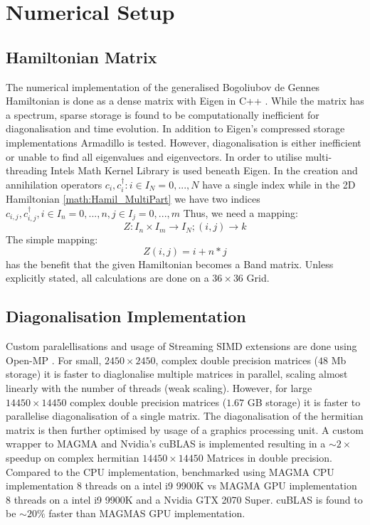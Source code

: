 \documentclass[Master]{subfiles}
\begin{document}
\section{Numerical Setup}
\subsection{Hamiltonian Matrix}
The numerical implementation of the generalised Bogoliubov de Gennes Hamiltonian  is done as a dense matrix with Eigen \cite{eigenweb} in C++ \cite{ISO:2017:IIIa}.
While the matrix has a spectrum, sparse storage is found to be computationally inefficient for diagonalisation and time evolution. In addition to Eigen's compressed storage implementations Armadillo \cite{sanderson2016armadillo}\cite{sanderson2018user} is tested. However, diagonalisation is either inefficient or unable to find all eigenvalues and eigenvectors. In order to utilise multi-threading Intels Math Kernel Library \cite{intel-alt} is used beneath Eigen.
In  the creation and annihilation operators $c_i,c^{\dag}_i : i \in I_N = {0,...,N}$ have a single index while in the 2D Hamiltonian \eqref{math:Hamil_MultiPart} we have two indices $c_{i,j},c^{\dag}_{i,j}, i \in I_n = {0,...,n}, j \in I_j = {0,...,m}$  Thus, we need a mapping:
$$Z:I_n \times I_m \rightarrow I_N; (i,j)\rightarrow k$$
The simple mapping:
$$
Z(i,j) = i + n*j 
$$
has the benefit that the given Hamiltonian becomes a Band matrix.
Unless explicitly stated, all calculations are done on a $36\times36$ Grid.
\subsection{Diagonalisation Implementation}
Custom paralellisations and usage of Streaming SIMD extensions are done using Open-MP \cite{dagum1998openmp}. For small, $2450\times2450$, complex double precision matrices ($48$ Mb storage) it is faster to diaglonalise multiple matrices in parallel, scaling almost linearly with the number of threads (weak scaling). However, for large  $14450\times14450$ complex double precision matrices ($1.67$ GB storage) it is faster to parallelise diagonalisation of a single matrix. The diagonalisation of the hermitian matrix is then further optimised by usage of a graphics processing unit. A custom wrapper to MAGMA \cite{tdb10} and Nvidia's cuBLAS is implemented resulting in a $\sim 2\times$ speedup on complex hermitian $14450\times14450$ Matrices in double precision. Compared to the CPU implementation, benchmarked using MAGMA CPU implementation 8 threads on a intel i9 9900K vs MAGMA GPU implementation 8 threads on a intel i9 9900K and a Nvidia GTX 2070 Super. cuBLAS is found to be $\sim 20 \%$ faster than MAGMAS GPU implementation.
\end{document}
